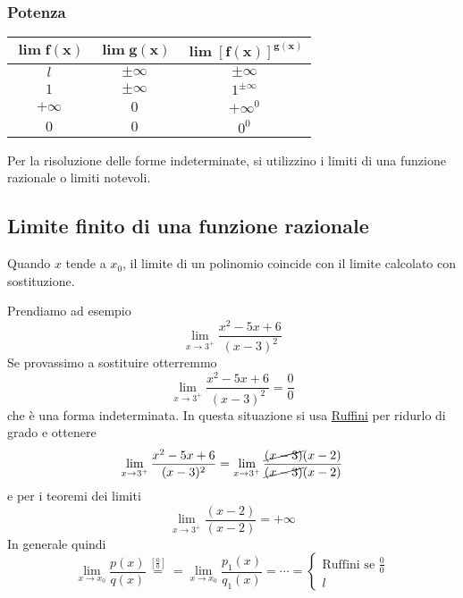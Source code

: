 \subsubsection{Potenza}
\begin{center}
	\begin{tabular}{ccc}
		$\boldsymbol{\lim f(x)}$ & $\boldsymbol{\lim g(x)}$ &
		$\boldsymbol{\lim[f(x)]^{g(x)}}$\\\hline
		$l$ & $\pm\infty$ & $\pm\infty$\\
		$1$ & $\pm\infty$ & $\boxed{1^{\pm\infty}}$\\
		$+\infty$ & $0$ & $\boxed{+\infty^0}$\\
		$0$ & $0$ & $\boxed{0^0}$
	\end{tabular}
\end{center}

Per la risoluzione delle forme indeterminate, si utilizzino i limiti di una funzione razionale o 
limiti notevoli.

\subsection{Limite finito di una funzione razionale}
\begin{limiteFinitoFunzRaz}
	Quando $x$ tende a $x_0$, il limite di un polinomio coincide con il limite calcolato con 
	sostituzione.
\end{limiteFinitoFunzRaz}

Prendiamo ad esempio
\begin{equation*}
\lim\limits_{x\to3^+}\frac{x^2-5x+6}{(x-3)^2}
\end{equation*}
Se provassimo a sostituire otterremmo
\begin{equation*}
\lim\limits_{x\to3^+}\frac{x^2-5x+6}{(x-3)^2} = \frac{0}{0}
\end{equation*}
che è una forma indeterminata. In questa situazione si usa \hyperref[ruffini]{Ruffini} per ridurlo di
grado e ottenere
\begin{equation*}
\lim\limits_{x\to3^+}\frac{x^2-5x+6}{(x-3)^2} = 
\lim\limits_{x\to3^+}\frac{\cancel{(x-3)}(x-2)}{\cancel{(x-3)}(x-2)}
\end{equation*}
e per i teoremi dei limiti
\begin{equation*}
\lim\limits_{x\to3^+}\frac{(x-2)}{(x-2)} = +\infty
\end{equation*}
In generale quindi
\begin{equation*}
\lim\limits_{x\to x_0}\frac{p(x)}{q(x)} \overset{\left[\frac{0}{0}\right]}{=} =
\lim\limits_{x\to x_0}\frac{p_1(x)}{q_1(x)} = \dotsb = \begin{cases}
\text{Ruffini se }\frac{0}{0}\\
l
\end{cases}
\end{equation*}


